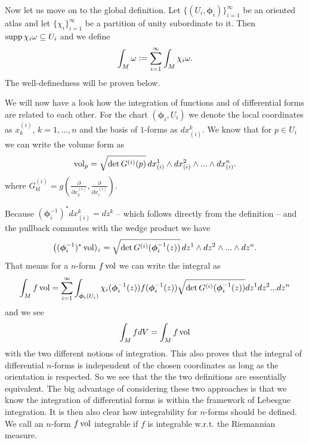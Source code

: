 \documentclass[../main.tex]{subfiles}
\begin{document}
Now let us move on to the global definition. Let $\{(U_i,\boldsymbol{\phi}_i)\}_{i=1}^\infty$
be an oriented atlas and let $\{ \chi_i \}_{i=1}^\infty$ be a partition 
of unity subordinate to it. 
Then $\operatorname{supp} \chi_i \omega \subseteq U_i$ 
and we define 
\begin{align*}
    \int_M \omega \vcentcolon= \sum_{i=1}^\infty \int_M \chi_i \omega.
\end{align*} 
The well-definedness will be proven below.

We will now have a look how the integration of functions and of 
differential forms are related to each other. 
For the chart $(\boldsymbol{\phi}_i, U_i)$ we denote the local coordinates as 
$x^{(i)}_k$, $k=1,...,n$ and the basis of $1$-forms as $dx_{(i)}^k$.
We know that for $p \in U_i$ we can write the volume form as
\begin{align*}
    \operatorname{vol}_p = \sqrt{ \det G^{(i)}(p)} \,
        dx_{(i)}^1 \wedge dx_{(i)}^2 \wedge ... \wedge dx_{(i)}^n.
\end{align*}
where $G^{(i)}_{kl} = g(\frac{\partial}{\partial x^{(i)}_k},\frac{\partial}{\partial x^{(i)}_l} )$.

Because $(\boldsymbol{\phi}_i^{-1})^* dx_{(i)}^k = dz^k$ -- which follows directly from the 
definition -- and the pullback commutes with the wedge product we have
\begin{align*}
    \big( (\boldsymbol{\phi}_i^{-1})^* \operatorname{vol})_z =  
        \sqrt{ \det G^{(i)}(\boldsymbol{\phi}_i^{-1}(z))} \,
        dz^1 \wedge dz^2 \wedge ... \wedge dz^n.
\end{align*}
That means for a $n$-form $f \operatorname{vol}$ we can write the integral as
\begin{align*}
    \int_M f \operatorname{vol} = \sum_{i=1}^\infty \int_{\boldsymbol{\phi}_i(U_i)} 
    \chi_i(\boldsymbol{\phi}_i^{-1}(z)) f(\boldsymbol{\phi}_i^{-1}(z))
        \sqrt{ \det G^{(i)}(\boldsymbol{\phi}_i^{-1}(z))} dz^1 dz^2 ... dz^n
\end{align*} 
and we see 
\begin{align*}
    \int_M f dV = \int_M f \operatorname{vol}
\end{align*}
with the two different notions of integration. This also proves that 
the integral of differential $n$-forms is independent of the chosen 
coordinates as long as the orientation is respected. So we see that the
the two definitions are essentially equivalent.
The big advantage of considering these two
approaches is that we know the integration of 
differential forms is within the framework of Lebesgue integration. 
It is then also 
clear how integrability for $n$-forms should be defined. We call an 
$n$-form $f \operatorname{vol}$ integrable if $f$ is integrable w.r.t. the Riemannian measure.
\end{document}
